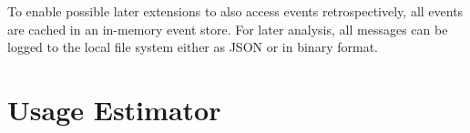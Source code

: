 To enable possible later extensions to also access events retrospectively, all events are cached in an in-memory event
store. For later analysis, all messages can be logged to the local file system either as \ac{JSON} or in binary format.

%
%
%

\section{Usage Estimator}
\label{sec:usage_estimator}



